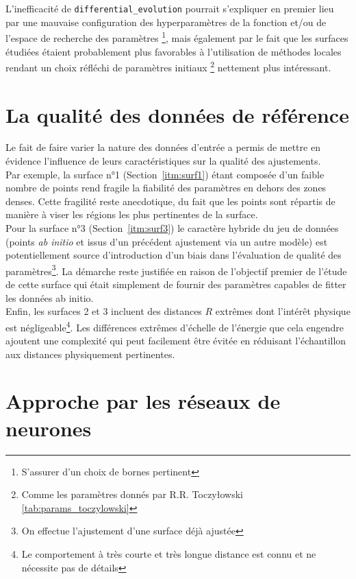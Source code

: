 \documentclass[11pt, a4paper, openany]{report}
\begin{document}
\noindent L'inefficacité de \texttt{differential\_evolution} pourrait s'expliquer en
premier lieu par une mauvaise configuration des hyperparamètres de la fonction
et/ou de l'espace de recherche des paramètres \footnote{S'assurer d'un choix de
bornes pertinent}, mais également par le fait que les surfaces étudiées étaient
probablement plus favorables à l'utilisation de méthodes locales rendant un 
choix réfléchi de paramètres initiaux \footnote{Comme les paramètres donnés par R.R. Toczyłowski
\ref{tab:params_toczylowski}}
nettement plus intéressant.

\section{La qualité des données de référence}

\noindent Le fait de faire varier la nature des données d'entrée a permis de
mettre en évidence l'influence de leurs caractéristiques sur la qualité des 
ajustements.\\ 

\noindent Par exemple, la surface n°1 (Section~\ref{itm:surf1})
étant composée d'un faible nombre de points rend fragile la fiabilité des
paramètres en dehors des zones denses. Cette fragilité reste anecdotique, du
fait que les points sont répartis de manière à viser les régions les plus 
pertinentes de la surface.\\

\noindent Pour la surface n°3 (Section~\ref{itm:surf3})
le caractère hybride du jeu de données (points \textit{ab initio} et issus d'un
précédent ajustement via un autre modèle) est potentiellement source 
d'introduction d'un biais dans l'évaluation de qualité des paramètres\footnote{
On effectue l'ajustement d'une surface déjà ajustée}. La démarche reste justifiée
en raison de l'objectif premier de l'étude de cette surface qui était simplement
de fournir des paramètres capables de fitter les données ab initio.\\ 

\noindent Enfin, les surfaces 2 et 3 incluent des distances $R$ extrêmes dont
l'intérêt physique est négligeable\footnote{Le comportement à très courte et très longue distance 
est connu et ne nécessite pas de détails}. Les différences extrêmes d'échelle de
l'énergie que cela engendre ajoutent une complexité qui peut facilement être 
évitée en réduisant l'échantillon aux distances physiquement pertinentes.

\section{Approche par les réseaux de neurones}
\end{document}
